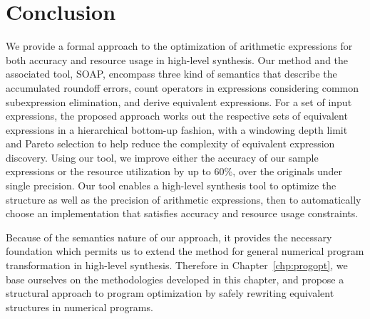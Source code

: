 \section{Conclusion}
\label{so:sec:conclusion}

We provide a formal approach to the optimization of arithmetic expressions
for both accuracy and resource usage in high-level synthesis. Our method and
the associated tool, SOAP, encompass three kind of semantics that describe
the accumulated roundoff errors, count operators in expressions considering
common subexpression elimination, and derive equivalent expressions. For a
set of input expressions, the proposed approach works out the respective
sets of equivalent expressions in a hierarchical bottom-up fashion, with a
windowing depth limit and Pareto selection to help reduce the complexity of
equivalent expression discovery. Using our tool, we improve either the accuracy
of our sample expressions or the resource utilization by up to 60\%, over the
originals under single precision. Our tool enables a high-level synthesis tool
to optimize the structure as well as the precision of arithmetic expressions,
then to automatically choose an implementation that satisfies accuracy and
resource usage constraints.

Because of the semantics nature of our approach, it provides the necessary
foundation which permits us to extend the method for general numerical program
transformation in high-level synthesis. Therefore in Chapter~\ref{chp:progopt},
we base ourselves on the methodologies developed in this chapter, and propose
a structural approach to program optimization by safely rewriting equivalent
structures in numerical programs.
